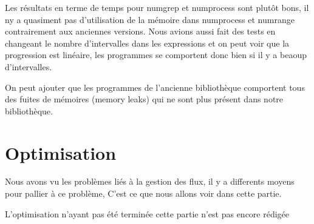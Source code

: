 Les r\'esultats en terme de temps pour numgrep et numprocess sont plut\^ot bons, il ny a quasiment pas d'utilisation de la m\'emoire dans numprocess et numrange contrairement aux anciennes versions. 
Nous avions aussi fait des tests en changeant le nombre d'intervalles dans les expressions et on peut voir que la progression est linéaire, les programmes se comportent donc bien si il y a beaoup d'intervalles.

On peut ajouter que les programmes de l'ancienne biblioth\`eque comportent tous des fuites de m\'emoires (memory leaks) qui ne sont plus pr\'esent 
dans notre biblioth\`eque.

\section{Optimisation}

Nous avons vu les problèmes li\'es à la gestion des flux, il y a differents moyens pour pallier \`a ce probl\`eme, 
C'est ce que nous allons voir dans cette partie.

L'optimisation n'ayant pas \'et\'e termin\'ee cette partie n'est pas encore rédig\'ee